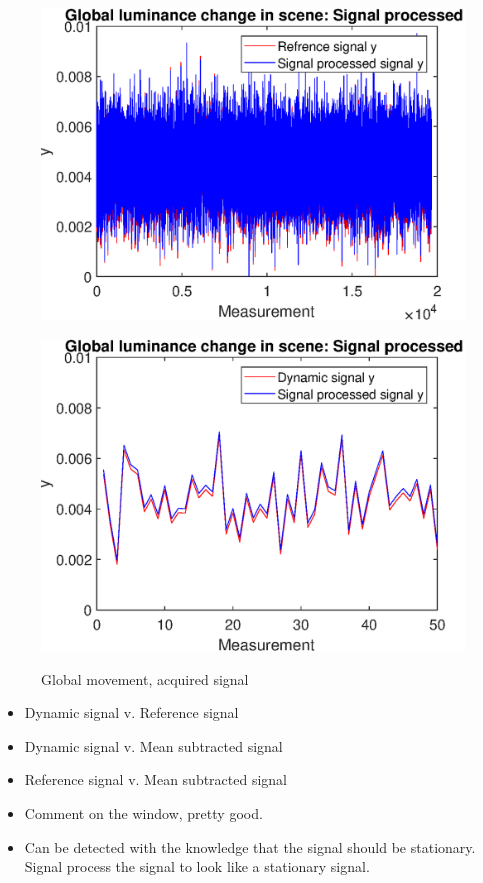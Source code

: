 \begin{figure}[H]
\begin{minipage}[t]{0.495\textwidth}
    \includegraphics[width=1\textwidth]{result/dynamic/lum/intense_change_sp_ref.eps}
    \label{fig:lum_sig_3}
\end{minipage}
\begin{minipage}[t]{0.495\textwidth}
    \includegraphics[width = \textwidth]{result/dynamic/lum/intense_change_sp_ref_win.eps}
    \label{fig:lum_sig_4}
\end{minipage}
    \caption{Global movement, acquired signal}
    \label{fig:lum_sig}
\end{figure}

\begin{itemize}
    \item Dynamic signal v. Reference signal
    \item Dynamic signal v. Mean subtracted signal
    \item Reference signal v. Mean subtracted signal
    \item Comment on the window, pretty good.
    \item Can be detected with the knowledge that the signal should be stationary. Signal process the signal to look like a stationary signal.
\end{itemize}


